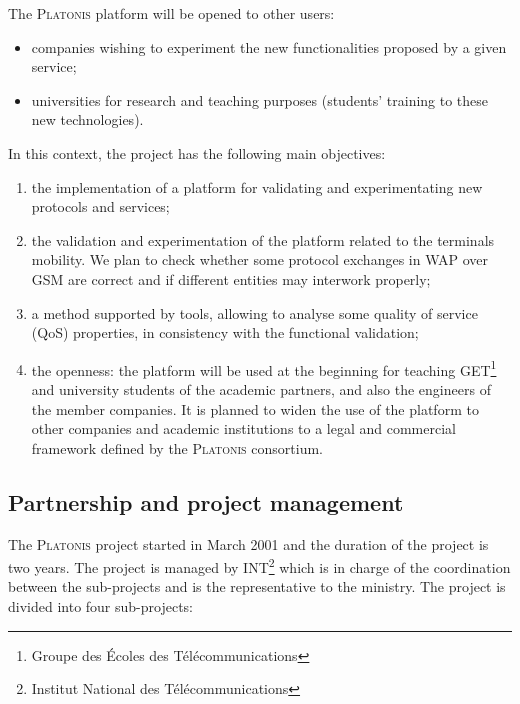 The \textsc{Platonis} platform will be opened to other users: 

\begin{itemize}
  \item companies wishing to experiment the new functionalities
        proposed by a given service;

  \item universities for research and teaching purposes (students'
        training to these new technologies).
\end{itemize}

In this context, the project has the following main objectives:

\begin{enumerate}

  \item the implementation of a platform for validating and
        experimentating new protocols and services;
  
  \item the validation and experimentation of the platform related to
        the terminals mobility. We plan to check whether some protocol
        exchanges in WAP over GSM are correct and if different
        entities may interwork properly;

  \item a method supported by tools, allowing to analyse some quality
        of service (QoS) properties, in consistency with the
        functional validation;

  \item the openness: the platform will be used at the beginning for
        teaching GET\footnote{Groupe des Écoles des
        Télécommunications} and university students of
        the academic partners, and also the engineers of the member
        companies. It is planned to widen the use of the platform to
        other companies and academic institutions to a legal and
        commercial framework defined by the \textsc{Platonis}
        consortium.

\end{enumerate}


\subsection{Partnership and project management}

The \textsc{Platonis} project started in March 2001 and the duration
of the project is two years.  The project is managed by
INT\footnote{Institut National des T\'el\'ecommunications} which is in
charge of the coordination between the sub-projects and is the
representative to the ministry. The project is divided into four
sub-projects:

